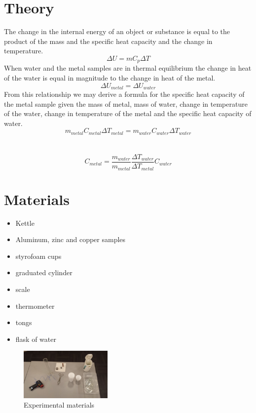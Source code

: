 \documentclass{article}
\begin{document}
\section{Theory}
The change in the internal energy of an object or substance is equal to the product of the mass and the specific heat capacity and the change in temperature.
$$\Delta U=mC_p\Delta T$$
When water and the metal samples are in thermal equilibrium the change in heat of the water is equal in magnitude to the change in heat of the metal.
$$\Delta U_{metal}=\Delta U_{water}$$
From this relationship we may derive a formula for the specific heat capacity of the metal sample given the mass of metal, mass of water, change in temperature of the water, change in temperature of the metal and the specific heat capacity of water.
$$m_{metal}C_{metal}\Delta T_{metal}=m_{water}C_{water}\Delta T_{water}$$\\
\\
$$\boxed{C_{metal}=\frac{m_{water}}{m_{metal}}  \frac{\Delta T_{water}}{\Delta T_{metal}}    C_{water}}$$

\newpage

\section{Materials}
\begin{itemize}
\item Kettle 
\item Aluminum, zinc and copper samples
\item styrofoam cups
\item graduated cylinder
\item scale
\item thermometer
\item tongs
\item flask of water
\end{itemize}
\begin{figure}[h]
\begin{center}
\includegraphics[width=0.4\textwidth]{pic} %
\caption{Experimental materials}
\end{center}
\end{figure}
\end{document}

